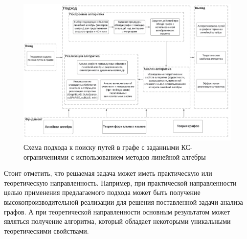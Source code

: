 \begin{figure}
    \centering
	\includegraphics[width = 17.8cm]{Dissertation/images/schema.pdf}
	\caption{Схема подхода к поиску путей в графе с заданными КС-ограничениями с использованием методов линейной алгебры}
	\label{fig:schema}
\end{figure}

Стоит отметить, что решаемая задача может иметь практическую или теоретическую направленность. Например, при практической направленности целью применения предлагаемого подхода может быть получение высокопроизводительной реализации для решения поставленной задачи анализа графов. А при теоретической направленности основным результатом может являться получение алгоритма, который обладает некоторыми уникальными теоретическими свойствами.

